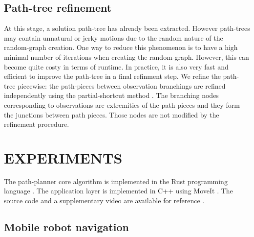 \documentclass[letterpaper, 10 pt, conference]{ieeeconf}  %
\begin{document}
\subsection{Path-tree refinement}
At this stage, a solution path-tree has already been extracted. However path-trees may contain  unnatural or jerky motions due to the random nature of the random-graph creation. One way to reduce this phenomenon is to have a high minimal number of iterations when creating the random-graph. However, this can become quite costy in terms of runtime. In practice, it is also very fast and efficient to improve the path-tree in a final refinment step. We refine the path-tree piecewise: the path-pieces between observation branchings are refined independently using the partial-shortcut method \cite{geraerts2007creating}. The branching nodes corresponding to observations are extremities of the path pieces and they form the junctions between path pieces. Those nodes are not modified by the refinement procedure. 




\section{EXPERIMENTS}
The path-planner core algorithm is implemented in the Rust programming language \cite{matsakis2014rust}. The application layer is implemented in C++ using MoveIt \cite{coleman2014reducing}. The source code and a supplementary video are available for reference \footnotemark {}. %

\subsection{Mobile robot navigation} \label{experiement:navigation}
\end{document}
